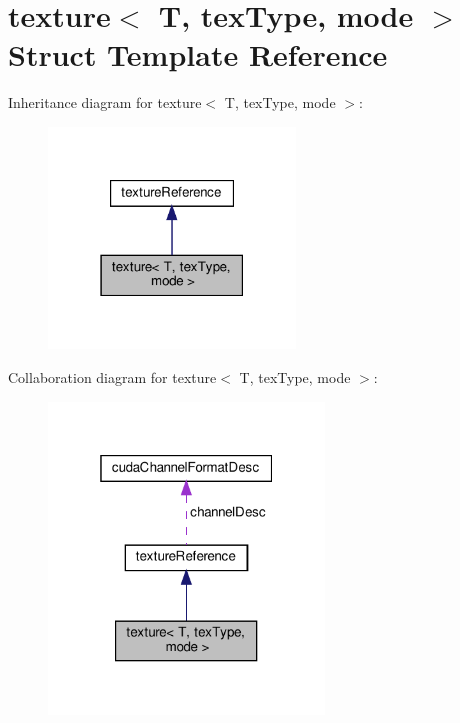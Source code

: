 \hypertarget{structtexture}{}\section{texture$<$ T, tex\+Type, mode $>$ Struct Template Reference}
\label{structtexture}


Inheritance diagram for texture$<$ T, tex\+Type, mode $>$\+:\nopagebreak
\begin{figure}[H]
\begin{center}
\leavevmode
\includegraphics[width=186pt]{structtexture__inherit__graph}
\end{center}
\end{figure}


Collaboration diagram for texture$<$ T, tex\+Type, mode $>$\+:\nopagebreak
\begin{figure}[H]
\begin{center}
\leavevmode
\includegraphics[width=208pt]{structtexture__coll__graph}
\end{center}
\end{figure}
